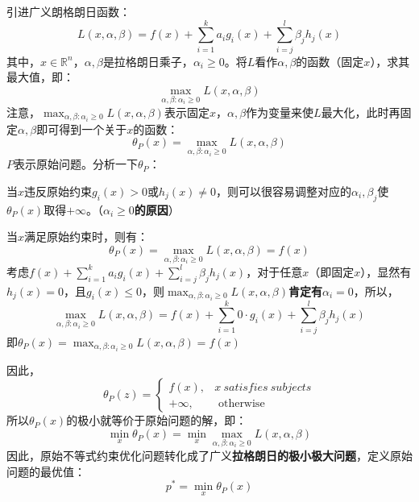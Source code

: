 引进广义朗格朗日函数：
$$
L(x, \alpha, \beta) = f(x) + \sum_{i=1}^k a_i g_i(x) + \sum_{i=j}^l \beta_j h_j(x)
$$
其中，$x \in \mathbb{R}^n$，$\alpha, \beta$是拉格朗日乘子，$\alpha_i \geqslant 0$。将$L$看作$\alpha, \beta$的函数（固定$x$），求其最大值，即：
$$
\mathop{max}_{\alpha, \beta:\alpha_i \geqslant 0} L(x, \alpha, \beta)
$$
注意，$\mathop{max}_{\alpha, \beta:\alpha_i \geqslant 0} L(x, \alpha, \beta)$表示固定$x$，$\alpha, \beta$作为变量来使$L$最大化，此时再固定$\alpha, \beta$即可得到一个关于$x$的函数：
$$
\theta_P (x) = \mathop{max}_{\alpha, \beta:\alpha_i \geqslant 0} L(x, \alpha, \beta)
$$
$P$表示原始问题。分析一下$\theta_P$：
\begin{myitemize}
	\item 当$x$违反原始约束$g_i(x) > 0$或$h_j(x) \neq 0$，则可以很容易调整对应的$\alpha_i, \beta_j$使$\theta_P(x)$取得$+\infty$。（\textbf{$\alpha_i \geqslant 0$的原因}）
	\item 当$x$满足原始约束时，则有：
	$$
	\theta_P(x) = \mathop{max}_{\alpha, \beta:\alpha_i \geqslant 0} L(x, \alpha, \beta) = f(x)
	$$
	考虑$f(x) + \sum_{i=1}^k a_i g_i(x) + \sum_{i=j}^l \beta_j h_j(x)$，对于任意$x$（即固定$x$），显然有$h_j(x) = 0$，且$g_i(x) \leqslant 0$，则$\mathop{max}_{\alpha, \beta:\alpha_i \geqslant 0} L(x, \alpha, \beta)$\textbf{肯定有$\alpha_i = 0$}，所以，
	$$
	\mathop{max}_{\alpha, \beta:\alpha_i \geqslant 0} L(x, \alpha, \beta) = f(x) + \sum_{i=1}^k 0 \cdot g_i(x) + \sum_{i=j}^l \beta_j h_j(x)
	$$
	即$\theta_P(x) = \mathop{max}_{\alpha, \beta:\alpha_i \geqslant 0} L(x, \alpha, \beta) = f(x)$
\end{myitemize}
因此，
$$
\theta_P(z)= \begin{cases}f(x), & x\ satisfies\ subjects \\ +\infty, & \text { otherwise }\end{cases}
$$
所以$\theta_P(x)$的极小就等价于原始问题的解，即：
$$
\mathop{min}_{x} \theta_P(x) = \mathop{min}_{x} \mathop{max}_{\alpha, \beta: \alpha_i \geqslant 0} L(x, \alpha, \beta)
$$
因此，原始不等式约束优化问题转化成了广义\textbf{拉格朗日的极小极大问题}，定义原始问题的最优值：
$$
p^* = \mathop{min}_{x} \theta_P(x)
$$

